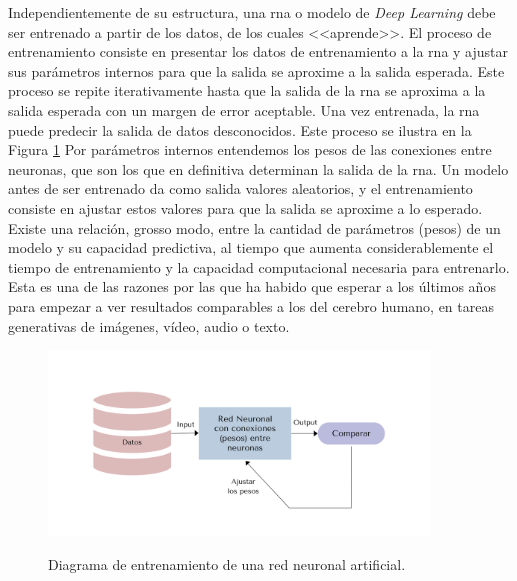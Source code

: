 Independientemente de su estructura, una \gls{rna} o modelo de \emph{Deep Learning} debe ser entrenado a partir de los datos, de los cuales <<aprende>>. El proceso de entrenamiento consiste en presentar los datos de entrenamiento a la \gls{rna} y ajustar sus parámetros internos para que la salida se aproxime a la salida esperada. Este proceso se repite iterativamente hasta que la salida de la \gls{rna} se aproxima a la salida esperada con un margen de error aceptable. Una vez entrenada, la \gls{rna} puede predecir la salida de datos desconocidos. Este proceso se ilustra en la Figura \ref{fig:ann_training} Por parámetros internos entendemos los pesos de las conexiones entre neuronas, que son los que en definitiva determinan la salida de la \gls{rna}. Un modelo antes de ser entrenado da como salida valores aleatorios, y el entrenamiento consiste en ajustar estos valores para que la salida se aproxime a lo esperado. Existe una relación, grosso modo, entre la cantidad de parámetros (pesos) de un modelo y su capacidad predictiva, al tiempo que aumenta considerablemente el tiempo de entrenamiento y la capacidad computacional necesaria para entrenarlo. Esta es una de las razones por las que ha habido que esperar a los últimos años para empezar a ver resultados comparables a los del cerebro humano, en tareas generativas de imágenes, vídeo, audio o texto.

\begin{figure}[H]
    \caption[Diagrama de entrenamiento de una red neuronal artificial]{Diagrama de entrenamiento de una red neuronal artificial.}
    \centering
    \includegraphics[width=0.9\textwidth]{./figuras/ann_training.png}
    \source{\propio}
    \label{fig:ann_training}
\end{figure}

